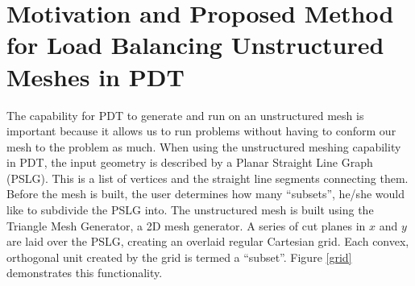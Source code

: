 \documentclass[11pt, letterpaper,titlepage,oneside]{article}
\begin{document}
\section{Motivation and Proposed Method for Load Balancing Unstructured Meshes in PDT}

The capability for PDT to generate and run on an unstructured mesh is important because it allows us to run problems without having to conform our mesh to the problem as much. When using the unstructured meshing capability in PDT, the input geometry is described by a Planar Straight Line Graph (PSLG). This is a list of vertices and the straight line segments connecting them. Before the mesh is built, the user determines how many ``subsets'', he/she would like to subdivide the PSLG into. The unstructured mesh is built using the Triangle Mesh Generator\cite{triangle}, a 2D mesh generator. A series of cut planes in $x$ and $y$ are laid over the PSLG, creating an overlaid regular Cartesian grid. Each convex, orthogonal unit created by the grid is termed a ``subset''. Figure \ref{grid} demonstrates this functionality.
\end{document}
